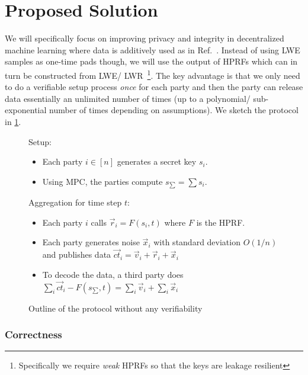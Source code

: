 \newcommand{\summedSK}{s_{\sum}}

\section{Proposed Solution}
We will specifically focus on improving privacy and integrity in decentralized machine learning where data is additively used as in Ref.~\cite{stevens2021efficientdifferentiallyprivatesecure}.
Instead of using LWE samples as one-time pads though, we will use the output of HPRFs which can in turn be constructed from LWE/ LWR~\footnote{Specifically we require \emph{weak} HPRFs so that the keys are leakage resilient}.
The key advantage is that we only need to do a verifiable setup process \emph{once} for each party and then the party can release data essentially an unlimited number of times (up to a polynomial/ sub-exponential number of times depending on assumptions).
We sketch the protocol in \cref{fig:protSimp}.

\begin{figure}[H]
	\begin{mdframed}
		Setup: \begin{itemize}
			\item Each party $i \in [n]$ generates a secret key $s_i.$
			\item Using MPC, the parties compute $\summedSK = \sum s_i.$
		\end{itemize}
		Aggregation for time step $t$: \begin{itemize}
			\item Each party $i$ calls $\vec{r}_i = F(s_i, t)$  where $F$ is the HPRF.
			\item Each party generates noise $\vec{x}_i$ with standard deviation $O(1/n)$ and publishes data $\overrightarrow{ct}_i = \vec{v}_i + \vec{r}_i + \vec{x}_i$ 
			\item To decode the data, a third party does $\sum_i \overrightarrow{ct}_i - F(\summedSK, t) = \sum_i \vec{v}_i + \sum_i \vec{x}_i$
		\end{itemize}
	\end{mdframed}
	\caption{Outline of the protocol without any verifiability}
	\label{fig:protSimp}
\end{figure}

\subsubsection*{Correctness}

